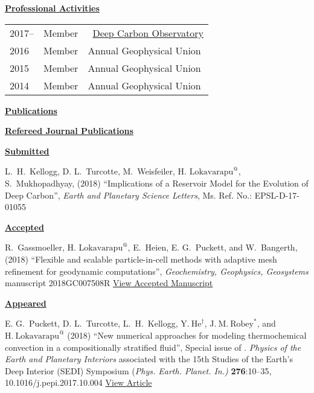 \documentclass[11pt]{ltxdoc}
\begin{document}
\vskip 12pt

\begin{center}
	\textbf{\underline{Professional Activities}}
\end{center}

\vskip -06pt

\addtolength{\tabcolsep}{15pt}   
\begin{tabular}{lll}
  2017--     & Member & ~\href{https://deepcarbon.net/}{Deep Carbon Observatory} \\
  2016     & Member & Annual Geophysical Union \\
  2015     & Member & Annual Geophysical Union \\
  2014     & Member & Annual Geophysical Union 
\end{tabular}
\addtolength{\tabcolsep}{1pt}  
 
\clearpage

\newpage

\begin{center}
  \textbf{\underline{Publications}}
\end{center}

\noindent
\textbf{\underline{Refereed Journal Publications}}


\noindent
\textbf{\underline{Submitted}}


\hangindent 20pt
L.~H.~Kellogg, D. L.~Turcotte, M.~Weisfeiler, $\textrm{H.~Lokavarapu}^@$, S.~Mukhopadhyay, (2018) 
``Implications of a Reservoir Model for the
Evolution of Deep Carbon'', 
\textit{Earth and Planetary Science Letters}, Ms. Ref. No.:  EPSL-D-17-01055


\noindent
\textbf{\underline{Accepted}}

\hangindent 20pt
R.~Gassmoeller,  $\textrm{H.~Lokavarapu}^@$, E.~Heien, E. G.~Puckett, and W.~Bangerth, (2018) 
``Flexible and scalable particle-in-cell methods with adaptive mesh refinement for geodynamic computations'', 
\textit{Geochemistry, Geophysics, Geosystems} manuscript 2018GC007508R 
\href{https://www.math.ucdavis.edu/~egp/PUBLICATIONS/JOURNAL_ARTICLES/ACCEPTED/RG-HL-EH-EGP-WB-2018.pdf}{View Accepted Manuscript}

\noindent
\textbf{\underline{Appeared}}

\vskip 06pt


\hangindent 20pt
E. G.~Puckett, D. L.~Turcotte, L.~H.~Kellogg,  $\mathrm{Y.~He}^{\dagger}$, $\mathrm{J.~M.~Robey}^{*}$, and 
$\mathrm{H.~Lokavarapu}^{@}$ (2018)
``New numerical approaches for modeling thermochemical convection in a compositionally stratified fluid'', 
Special issue of . \textit{Physics of the Earth and Planetary Interiors} associated with the 15th Studies of the Earth's Deep Interior (SEDI) Symposium (\textit{Phys. Earth. Planet. In.)} \textbf{276}:10–35, 10.1016/j.pepi.2017.10.004
\href{https://www.math.ucdavis.edu/~egp/PUBLICATIONS/JOURNAL_ARTICLES/APPEARED/2018/EGP-DLT-YH-HL-JMR-LHK-2018.pdf}{View Article}
\end{document}
